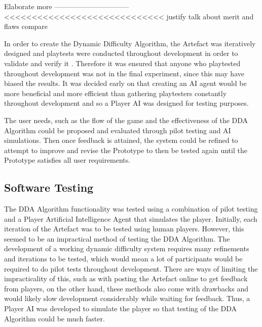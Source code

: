\documentclass[journal]{IEEEtran}
\begin{document}
Elaborate more --------------------------------<<<<<<<<<<<<<<<<<<<<<<<<<<<<<
justify talk about merit and flaws compare

In order to create the Dynamic Difficulty Algorithm, the Artefact was iteratively designed and playtests were conducted throughout development in order to validate and verify it \cite{fullerton2004game}. Therefore it was ensured that anyone who playtested throughout development was not in the final experiment, since this may have biased the results. It was decided early on that creating an AI agent would be more beneficial and more efficient than gathering playtesters constantly throughout development and so a Player AI was designed for testing purposes.

The user needs, such as the flow of the game and the effectiveness of the DDA Algorithm could be proposed and evaluated through pilot testing and AI simulations. Then once feedback is attained, the system could be refined to attempt to improve and revise the Prototype to then be tested again until the Prototype satisfies all user requirements.

\subsection{Software Testing}

The DDA Algorithm functionality was tested using a combination of pilot testing and a Player Artificial Intelligence Agent that simulates the player. Initially, each iteration of the Artefact was to be tested using human players. However, this seemed to be an impractical method of testing the DDA Algorithm. The development of a working dynamic difficulty system requires many refinements and iterations to be tested, which would mean a lot of participants would be required to do pilot tests throughout development. There are ways of limiting the impracticality of this, such as with posting the Artefact online to get feedback from players, on the other hand, these methods also come with drawbacks and would likely slow development considerably while waiting for feedback. Thus, a Player AI was developed to simulate the player so that testing of the DDA Algorithm could be much faster. 
\end{document}
